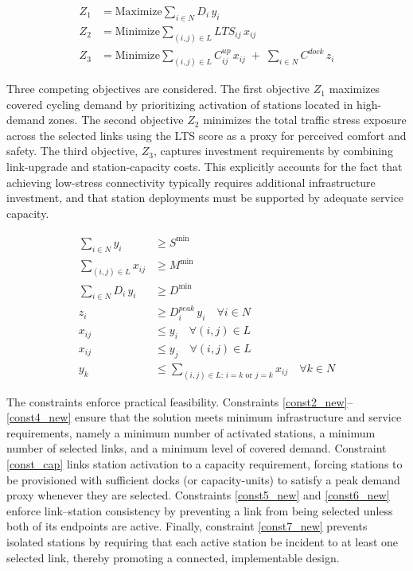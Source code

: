 \documentclass[preprint,authoryear,10pt]{elsarticle}
\begin{document}
\begin{align}
\label{obj1_new}
Z_1 &= \text{Maximize} \sum_{i \in N} D_i\, y_i \\
\label{obj2_new}
Z_2 &= \text{Minimize} \sum_{(i,j) \in L} LTS_{ij}\, x_{ij} \\
\label{obj3_new}
Z_3 &= \text{Minimize} \sum_{(i,j)\in L} C_{ij}^{up}\, x_{ij} \;+\; \sum_{i\in N} C^{dock}\, z_i
\end{align}

Three competing objectives are considered. The first objective $Z_1$ maximizes covered cycling demand by prioritizing activation of stations located in high-demand zones. The second objective $Z_2$ minimizes the total traffic stress exposure across the selected links using the LTS score as a proxy for perceived comfort and safety. The third objective, $Z_3$, captures investment requirements by combining link-upgrade and station-capacity costs. This explicitly accounts for the fact that achieving low-stress connectivity typically requires additional infrastructure investment, and that station deployments must be supported by adequate service capacity.

\begin{align}
\label{const2_new}
\sum_{i\in N} y_i &\ge S^{\min} \\
\label{const3_new}
\sum_{(i,j)\in L} x_{ij} &\ge M^{\min} \\
\label{const4_new}
\sum_{i\in N} D_i\, y_i &\ge D^{\min} \\
\label{const_cap}
z_i &\ge D_i^{peak}\, y_i \quad \forall i \in N \\
\label{const5_new}
x_{ij} &\le y_i \quad \forall (i,j)\in L \\
\label{const6_new}
x_{ij} &\le y_j \quad \forall (i,j)\in L \\
\label{const7_new}
y_k &\le \sum_{(i,j)\in L:\, i=k \text{ or } j=k} x_{ij} \quad \forall k\in N
\end{align}

The constraints enforce practical feasibility. Constraints \eqref{const2_new}--\eqref{const4_new} ensure that the solution meets minimum infrastructure and service requirements, namely a minimum number of activated stations, a minimum number of selected links, and a minimum level of covered demand. Constraint \eqref{const_cap} links station activation to a capacity requirement, forcing stations to be provisioned with sufficient docks (or capacity-units) to satisfy a peak demand proxy whenever they are selected. Constraints \eqref{const5_new} and \eqref{const6_new} enforce link--station consistency by preventing a link from being selected unless both of its endpoints are active. Finally, constraint \eqref{const7_new} prevents isolated stations by requiring that each active station be incident to at least one selected link, thereby promoting a connected, implementable design.
\end{document}

